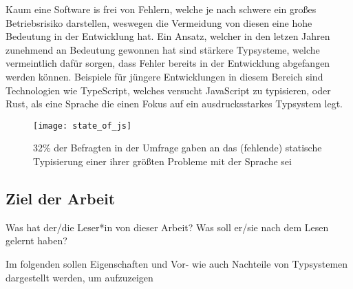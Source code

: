 Kaum eine Software is frei von Fehlern, welche je nach schwere ein großes Betriebsrisiko darstellen, weswegen die Vermeidung von diesen eine hohe Bedeutung
in der Entwicklung hat. 
Ein Ansatz, welcher in den letzen Jahren zunehmend an Bedeutung gewonnen hat sind stärkere Typsysteme, welche vermeintlich dafür sorgen, dass Fehler bereits
in der Entwicklung abgefangen werden können.
Beispiele für jüngere Entwicklungen in diesem Bereich sind Technologien wie TypeScript, welches versucht JavaScript zu typisieren, oder Rust, als eine Sprache die einen Fokus auf
ein ausdrucksstarkes Typsystem legt.

\begin{figure}[H]
  \centering
  \texttt{[image: state\_of\_js]}
  \caption{32\% der Befragten in der  Umfrage gaben an das (fehlende) statische Typisierung einer ihrer größten Probleme mit der Sprache sei \cite{Greif_Burel_2024}}
\end{figure}

\subsection{Ziel der Arbeit} 
Was hat der/die Leser*in von dieser Arbeit? Was soll er/sie nach dem Lesen gelernt haben?

Im folgenden sollen Eigenschaften und Vor- wie auch Nachteile von Typsystemen dargestellt werden, um aufzuzeigen 
